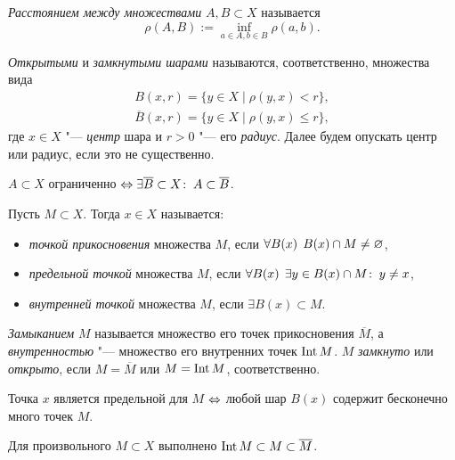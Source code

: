 \documentclass[main]{subfiles}
\begin{document}
\begin{definition}
  \emph{Расстоянием между множествами} \( A, B \subset X \)
  называется
  \[ \rho(A, B) := \inf_{a \in A, b \in B} \rho(a, b). \]
\end{definition}

\begin{definition}
  \emph{Открытыми} и \emph{замкнутыми шарами} называются, соответственно, множества вида
  \begin{gather}
    B(x, r) = \{ y \in X \mid \rho(y, x) < r \}, \\
    \overline{B}(x, r) = \{ y \in X \mid \rho(y, x) \le r \},
  \end{gather}
  где \( x \in X \) "--- \emph{центр} шара и \( r > 0 \) "--- его \emph{радиус}.
  Далее будем опускать центр или радиус, если это не существенно.
\end{definition}

\begin{exercise}
  \( A \subset X \) ограниченно \( \Leftrightarrow \exists \overline{B} \subset X \colon \:
  A \subset \overline{B} \).
\end{exercise}

\begin{definition}
  Пусть \( M \subset X \). Тогда \( x \in X \) называется:
  \begin{itemize}
    \item \emph{точкой прикосновения} множества \( M \), если
      \( \forall {B(x)} \; \, B(x) \cap M \ne \varnothing \),
    \item \emph{предельной точкой} множества \( M \),
      если \( \forall {B(x)} \; \, \exists y \in B(x) \cap M \colon \: y \ne x \),
    \item \emph{внутренней точкой} множества \( M \),
      если \( \exists B(x) \subset M \).
  \end{itemize}
  \emph{Замыканием} \( M \) называется множество его точек прикосновения
  \( \overline{M} \), а \emph{внутренностью} "--- множество его внутренних
  точек \( \operatorname{Int} M \). \( M \) \emph{замкнуто} или \emph{открыто},
  если \( M = \overline{M} \) или \( M = \operatorname{Int} M \), соответственно.
\end{definition}

\begin{proposition}
  Точка \( x \) является предельной для \( M \) \( \Leftrightarrow \) любой шар
  \( B(x) \) содержит бесконечно много точек \( M \).
\end{proposition}

\begin{remark}
  Для произвольного \( M \subset X \) выполнено
  \( \operatorname{Int} M \subset M \subset \overline{M} \).
\end{remark}
\end{document}
